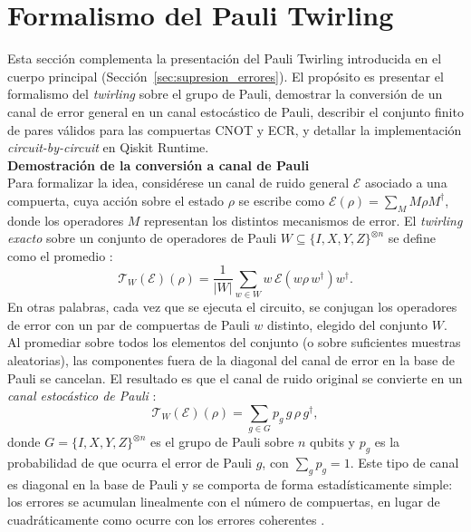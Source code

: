 \documentclass[12pt, spanish]{book}
\begin{document}
\section{Formalismo del Pauli Twirling}
\label{app:pt-formal}

Esta sección complementa la presentación del Pauli Twirling introducida en el cuerpo principal (Sección~\ref{sec:supresion_errores}). El propósito es presentar el formalismo del \textit{twirling} sobre el grupo de Pauli, demostrar la conversión de un canal de error general en un canal estocástico de Pauli, describir el conjunto finito de pares válidos para las compuertas CNOT y ECR, y detallar la implementación \textit{circuit-by-circuit} en Qiskit Runtime.\\

\textbf{Demostración de la conversión a canal de Pauli}\\

Para formalizar la idea, considérese un canal de ruido general $\mathcal{E}$ asociado a una compuerta, cuya acción sobre el estado $\rho$ se escribe como $\mathcal{E}(\rho) = \sum_M M\rho M^{\dagger}$, donde los operadores $M$ representan los distintos mecanismos de error. El \textit{twirling exacto} sobre un conjunto de operadores de Pauli $W \subseteq \{I, X, Y, Z\}^{\otimes n}$ se define como el promedio \cite{CaiBenjamin2018}:
\begin{equation}
    \mathcal{T}_W(\mathcal{E})(\rho) = \frac{1}{|W|} \sum_{w \in W} w\, \mathcal{E}\!\left(w \rho\, w^{\dagger}\right) w^{\dagger}.
    \label{eq:twirling_exacto}
\end{equation}
En otras palabras, cada vez que se ejecuta el circuito, se conjugan los operadores de error con un par de compuertas de Pauli $w$ distinto, elegido del conjunto $W$. Al promediar sobre todos los elementos del conjunto (o sobre suficientes muestras aleatorias), las componentes fuera de la diagonal del canal de error en la base de Pauli se cancelan. El resultado es que el canal de ruido original se convierte en un \textit{canal estocástico de Pauli} \cite{CaiBenjamin2018, Wallman2016}:
\begin{equation}
    \mathcal{T}_W(\mathcal{E})(\rho) = \sum_{g \in G} p_g \, g\, \rho\, g^{\dagger},
    \label{eq:canal_pauli}
\end{equation}
donde $G = \{I, X, Y, Z\}^{\otimes n}$ es el grupo de Pauli sobre $n$ qubits y $p_g$ es la probabilidad de que ocurra el error de Pauli $g$, con $\sum_g p_g = 1$. Este tipo de canal es diagonal en la base de Pauli y se comporta de forma estadísticamente simple: los errores se acumulan linealmente con el número de compuertas, en lugar de cuadráticamente como ocurre con los errores coherentes \cite{Wallman2016}.\\
\end{document}
